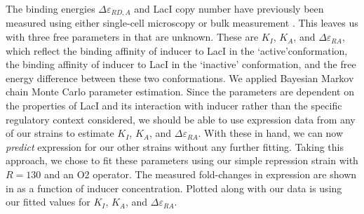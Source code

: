 The binding energies $\Delta \varepsilon_{RD,A}$ and LacI copy number have
previously been measured using either single-cell microscopy or bulk measurement
\cite{Oehler1994,Vilar2003,Garcia2011, Brewster2014}. This leaves us with three
free parameters in \eref[eq7] that are unknown. These are $K_I$, $K_A$, and
$\Delta\varepsilon_{RA}$, which reflect the binding affinity of inducer to LacI in the
\lq active\rq conformation, the binding affinity of inducer to LacI in the \lq inactive\rq
conformation, and the free energy difference between these two conformations. We
applied Bayesian Markov chain Monte Carlo parameter estimation. Since the parameters are dependent on the
properties of LacI and its interaction with inducer rather than the
specific regulatory context considered, we should be able to use expression data
from any of our strains to estimate $K_I$, $K_A$, and $\Delta\varepsilon_{RA}$. With these in hand,
we can now \textit{predict} expression for our other strains without any further fitting. Taking this approach, we chose to fit these parameters using our simple repression strain with $R=130$ and an O2 operator. The measured fold-changes in expression are shown in  as a function of inducer concentration. Plotted along with our data is \eref[eq7] using our fitted values for $K_I$, $K_A$, and $\Delta\varepsilon_{RA}$.



